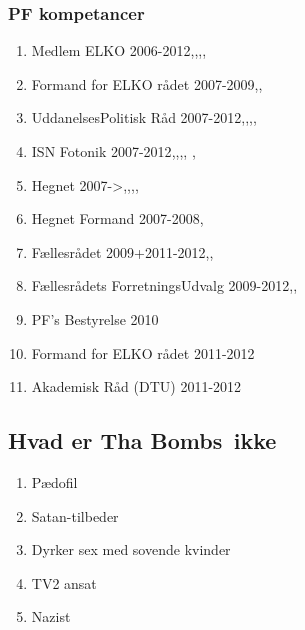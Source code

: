 \subsubsection{PF kompetancer}
\begin{enumerate}
\item Medlem ELKO 2006-2012\cite{bib:url:Beret2007},\cite{bib:url:Beret2008},\cite{bib:url:Beret2009},\cite{bib:url:Beret2010},\cite{bib:url:Beret2011}
\item Formand for ELKO rådet 2007-2009\cite{bib:url:Beret2007},\cite{bib:url:Beret2008},\cite{bib:url:Beret2009}
\item UddanelsesPolitisk Råd 2007-2012\cite{bib:url:Beret2007},\cite{bib:url:Beret2008},\cite{bib:url:Beret2009},\cite{bib:url:Beret2010},\cite{bib:url:Beret2011}
\item ISN Fotonik 2007-2012\cite{bib:url:Beret2007},\cite{bib:url:Beret2008},\cite{bib:url:Beret2009},\cite{bib:url:Beret2010},\cite{bib:url:Beret2011} , \cite{bib:url:ISNfoto}
\item Hegnet 2007->\cite{bib:url:Beret2007},\cite{bib:url:Beret2008},\cite{bib:url:Beret2009},\cite{bib:url:Beret2010},\cite{bib:url:Beret2011}
\item Hegnet Formand 2007-2008\cite{bib:url:Beret2007},\cite{bib:url:Beret2008}
\item Fællesrådet 2009+2011-2012\cite{bib:url:Beret2009},\cite{bib:url:Beret2010},\cite{bib:url:Beret2011}
\item Fællesrådets ForretningsUdvalg 2009-2012\cite{bib:url:Beret2009},\cite{bib:url:Beret2010},\cite{bib:url:Beret2011}
\item PF's Bestyrelse 2010\cite{bib:url:Beret2010}
\item Formand for ELKO rådet 2011-2012 \cite{bib:url:Beret2011}
\item Akademisk Råd (DTU) 2011-2012\cite{bib:url:Beret2011}
\end{enumerate}

\subsection{Hvad er Tha Bombs\texttrademark \, ikke}
\begin{enumerate}
\item Pædofil \cite{bib:url:Finn:Pedo}
\item Satan-tilbeder \cite{bib:url:Finn:Satan}
\item Dyrker sex med sovende kvinder \cite{bib:url:Finn:SovendeKvinder}
\item TV2 ansat \cite{bib:url:Finn:TV2}
\item Nazist\cite{bib:url:Finn:Nazist}
\end{enumerate}


